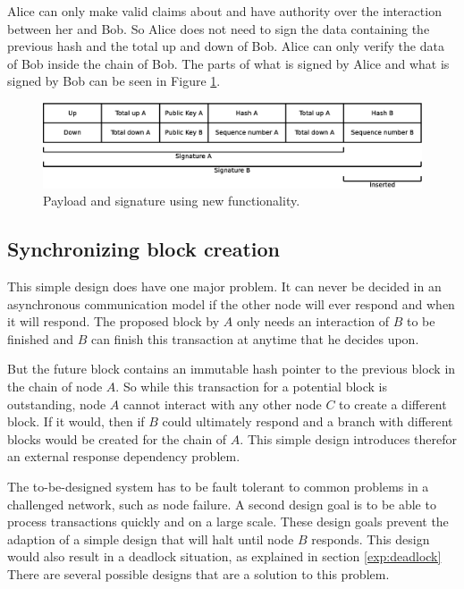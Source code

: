 Alice can only make valid claims about and have authority over the interaction between her and Bob.
So Alice does not need to sign the data containing the previous hash and the total up and down of Bob.
Alice can only verify the data of Bob inside the chain of Bob.
The parts of what is signed by Alice and what is signed by Bob can be seen in Figure \ref{fig:payload-signature-new}.

\begin{figure}
	\centerline{\includegraphics[scale=0.3]{design/figs/signature_new.eps}}
	\caption{Payload and signature using new functionality.}
	\label{fig:payload-signature-new}
\end{figure}


\subsection{Synchronizing block creation}
This simple design does have one major problem.
It can never be decided in an asynchronous communication model
if the other node will ever respond and when it will respond.
The proposed block by $A$ only needs an interaction of $B$ to be finished
and $B$ can finish this transaction at anytime that he decides upon.

But the future block contains an immutable hash pointer
to the previous block in the chain of node $A$.
So while this transaction for a potential block is outstanding,
node $A$ cannot interact with any other node $C$ to create a different block.
If it would, then if $B$ could ultimately respond and a branch with different blocks
would be created for the chain of $A$.
This simple design introduces therefor an external response dependency problem.

The to-be-designed system has to be fault tolerant to 
common problems in a challenged network, such as node failure.
A second design goal is to be able to process transactions quickly and on a large scale.
These design goals prevent the adaption of a simple design that will halt until node $B$ responds.
This design would also result in a deadlock situation, as explained in section \ref{exp:deadlock}
There are several possible designs that are a solution to this problem.

